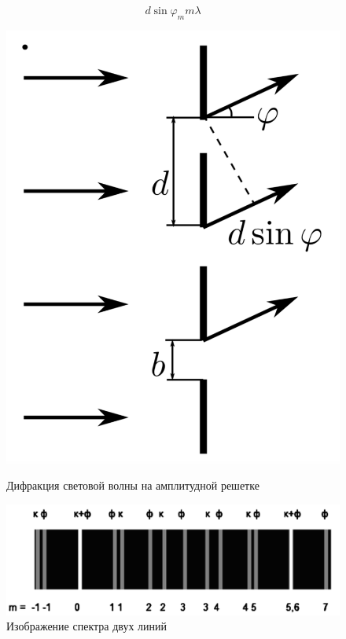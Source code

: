 \documentclass[a4paper]{article}
\begin{document}
\begin{equation}
    d \sin{\varphi_m} m\lambda
\end{equation}

\begin{figure}[H]
    \begin{center}
    \begin{minipage}[h]{0.3\linewidth}
    \includegraphics[width=1\linewidth]{p2.png}
    \caption{Дифракция световой волны на амплитудной решетке} 
    \label{p2}
    \end{minipage}
    \hfill 
    \begin{minipage}[h]{0.45\linewidth}
    \includegraphics[width=1\linewidth]{p3.png}
    \caption{Изображение спектра двух линий}
    \label{p3}
    \end{minipage}
    \end{center}
\end{figure}
\end{document}

